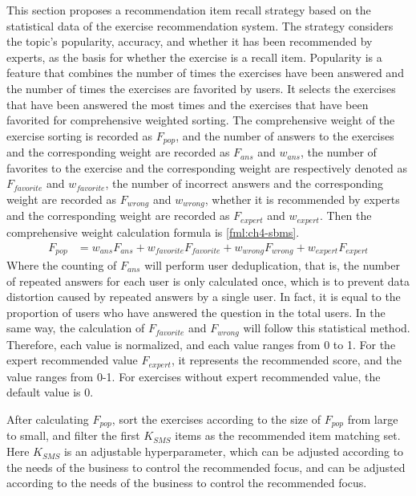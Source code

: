 This section proposes a recommendation item recall strategy based on the statistical data of the exercise recommendation system. The strategy considers the topic's popularity, accuracy, and whether it has been recommended by experts, as the basis for whether the exercise is a recall item. Popularity is a feature that combines the number of times the exercises have been answered and the number of times the exercises are favorited by users. It selects the exercises that have been answered the most times and the exercises that have been favorited for comprehensive weighted sorting. The comprehensive weight of the exercise sorting is recorded as \(F_{pop}\), and the number of answers to the exercises and the corresponding weight are recorded as \(F_{ans}\) and \(w_{ans}\), the number of favorites to the exercise and the corresponding weight are respectively denoted as \(F_{favorite}\) and \(w_{favorite} \), the number of incorrect answers and the corresponding weight are recorded as \(F_{wrong}\) and \(w_{wrong}\), whether it is recommended by experts and the corresponding weight are recorded as \(F_{expert}\) and \(w_{expert}\). Then the comprehensive weight calculation formula is \ref{fml:ch4-sbms}.
\begin{align}
  F_{pop} & = w_{ans}F_{ans}+w_{favorite}F_{favorite}+w_{wrong}F_{wrong}+w_{expert}F_{expert}\label{fml:ch4-sbms}
\end{align}
Where the counting of \(F_{ans}\) will perform user deduplication, that is, the number of repeated answers for each user is only calculated once, which is to prevent data distortion caused by repeated answers by a single user. In fact, it is equal to the proportion of users who have answered the question in the total users. In the same way, the calculation of \(F_{favorite}\) and \(F_{wrong}\) will follow this statistical method. Therefore, each value is normalized, and each value ranges from 0 to 1. For the expert recommended value \(F_{expert}\), it represents the recommended score, and the value ranges from 0-1. For exercises without expert recommended value, the default value is 0.

After calculating \(F_{pop}\), sort the exercises according to the size of \(F_{pop}\) from large to small, and filter the first \(K_{SMS}\) items as the recommended item matching set. Here \(K_{SMS}\) is an adjustable hyperparameter, which can be adjusted according to the needs of the business to control the recommended focus, and can be adjusted according to the needs of the business to control the recommended focus.

